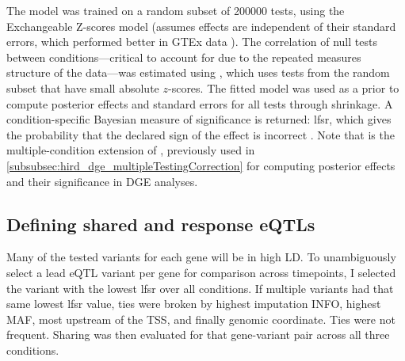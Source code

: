 
The  model was trained on a random subset of \num{200000} tests, using the Exchangeable Z-scores model (assumes effects are independent of their standard errors, which performed better in GTEx data \autocite{urbut2018FlexibleStatisticalMethods}).
The correlation of null tests between conditions---critical to account for due to the repeated measures structure of the data---was estimated using , which uses tests from the random subset that have small absolute $z$-scores.
The fitted model was used as a prior to compute posterior effects and standard errors for all tests through shrinkage.
A condition-specific Bayesian measure of significance is returned:
\gls{lfsr}, which gives the probability that the declared sign of the effect is incorrect \autocite{stephens2016FalseDiscoveryRates}.
Note that  is the multiple-condition extension of  \autocite{stephens2016FalseDiscoveryRates}, 
previously used in \cref{subsubsec:hird_dge_multipleTestingCorrection} for computing posterior effects and their significance in \gls{DGE} analyses.

\subsection{Defining shared and response eQTLs}
\label{subsec:hird_reQTL_methods_definingSharedAndreQTLs}

Many of the tested variants for each gene will be in high \gls{LD}.
To unambiguously select a lead \gls{eQTL} variant per gene for comparison across timepoints, I selected the variant with the lowest \gls{lfsr} over all conditions.
If multiple variants had that same lowest \gls{lfsr} value,
ties were broken by highest imputation INFO, highest \gls{MAF}, most upstream of the \gls{TSS}, and finally genomic coordinate.
Ties were not frequent.
Sharing was then evaluated for that gene-variant pair across all three conditions.

